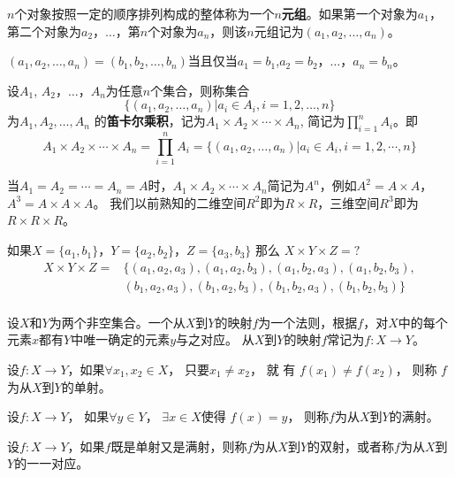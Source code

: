   \begin{Def}
    $n$个对象按照一定的顺序排列构成的整体称为一个{\bfseries $n$元组}。如果第一个对象为$a_1$，第二个对象为$a_2$，$\ldots$，第$n$个对象为$a_n$，则该$n$元组记为$(a_1,a_2, \ldots, a_n)$。

 $(a_1,a_2, \ldots, a_n)=(b_1,b_2, \ldots, b_n)$当且仅当$a_1=b_1$,$a_2=b_2$，$\ldots$，$a_n=b_n$。
  \end{Def}
  \begin{Def}
    设$A_1$, $A_2$，$\ldots$，$A_n$为任意$n$个集合，则称集合 \[\{(a_1,a_2, \ldots, a_n)|a_i\in A_i, i = 1,2,\ldots, n\}\] 为$A_1, A_2, \ldots, A_n$ 的{\bfseries 笛卡尔乘积}，记为$A_1 \times A_2 \times \cdots \times A_n$, 简记为$\prod_{i=1}^nA_i$。即
\begin{equation*}
  A_1 \times A_2 \times \cdots \times A_n = \prod_{i=1}^nA_i = \{(a_1,a_2, \ldots, a_n)|a_i \in A_i, i = 1, 2, \cdots, n\}
\end{equation*}

当$A_1=A_2=\cdots=A_n=A$时，$A_1 \times A_2\times \cdots \times A_n$简记为$A^n$，例如$A^2=A\times A$，$A^3=A\times A\times A$。
我们以前熟知的二维空间$R^2$即为$R\times R$，三维空间$R^3$即为$R\times R\times R$。

  \end{Def}
  \begin{Example}
    如果$X=\{a_1,b_1\}$，$Y=\{a_2,b_2\}$，$Z=\{a_3,b_3\}$ 那么 $X \times Y \times Z = ?$
    \begin{equation*}
      \begin{split}
       X \times Y \times Z =& \{ (a_1,a_2, a_3), (a_1,a_2, b_3), (a_1, b_2, a_3), (a_1,b_2, b_3), \\
&(b_1, a_2, a_3), (b_1, a_2, b_3), (b_1, b_2, a_3), (b_1, b_2, b_3) \}\\
      \end{split}
    \end{equation*}
  \end{Example}

  \begin{Def}
    设$X$和$Y$为两个非空集合。一个从$X$到$Y$的映射$f$为一个法则，根据$f$，对$X$中的每个元素$x$都有$Y$中唯一确定的元素$y$与之对应。
    从$X$到$Y$的映射$f$常记为$f:X\to Y$。
  \end{Def}
    \begin{Def}
    设$f:X\to Y$，如果$\forall x_1, x_2 \in X$， 只要$x_1 \neq x_2$，  就 有 $f(x_1) \neq f(x_2)$，   则称 $f$为从$X$到$Y$的单射。
  \end{Def}
  \begin{Def}
    设$f:X\to Y$， 如果$\forall y \in Y$， $\exists x \in X$使得 $f(x) = y$， 则称$f$为从$X$到$Y$的满射。
  \end{Def}
  \begin{Def}
    设$f:X\to Y$，如果$f$既是单射又是满射，则称$f$为从$X$到$Y$的双射，或者称$f$为从$X$到$Y$的一一对应。
  \end{Def}

